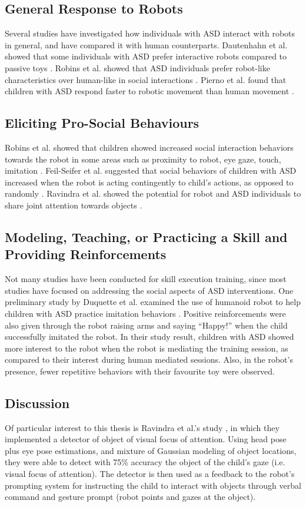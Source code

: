 \documentclass{ut-thesis}
\begin{document}
\subsection{General Response to Robots}
Several studies have investigated how individuals with ASD interact with robots in general, and have compared it with human counterparts.  Dautenhahn et al. showed that some individuals with ASD prefer interactive robots compared to passive toys \cite{dautenhahn2004towards}.  Robins et al. showed that ASD individuals prefer robot-like characteristics over human-like in social interactions \cite{robins2006does}.  Pierno et al. found that children with ASD respond faster to robotic movement than human movement \cite{pierno2008robotic}.


\subsection{Eliciting Pro-Social Behaviours}
Robins et al. showed that children showed increased social interaction behaviors towards the robot in some areas such as proximity to robot, eye gaze, touch, imitation \cite{robins2005robotic}.  Feil-Seifer et al. suggested that social behaviors of children with ASD increased when the robot is acting contingently to child's actions, as opposed to randomly \cite{feil2009toward}.  Ravindra et al. showed the potential for robot and ASD individuals to share joint attention towards objects \cite{ravindra2009therapeutic}.


\subsection{Modeling, Teaching, or Practicing a Skill and Providing Reinforcements}
Not many studies have been conducted for skill execution training, since most studies have focused on addressing the social aspects of ASD interventions.  One preliminary study by Duquette et al. examined the use of humanoid robot to help children with ASD practice imitation behaviors \cite{duquette2008exploring}.  Positive reinforcements were also given through the robot raising arms and saying ``Happy!'' when the child successfully imitated the robot.  In their study result, children with ASD showed more interest to the robot when the robot is mediating the training session, as compared to their interest during human mediated sessions.  Also, in the robot's presence, fewer repetitive behaviors with their favourite toy were observed.


\subsection{Discussion}
Of particular interest to this thesis is Ravindra et al.'s study \cite{ravindra2009therapeutic}, in which they implemented a detector of object of visual focus of attention.  Using head pose plus eye pose estimations, and mixture of Gaussian modeling of object locations, they were able to detect with 75\% accuracy the object of the child's gaze (i.e. visual focus of attention).  The detector is then used as a feedback to the robot's prompting system for instructing the child to interact with objects through verbal command and gesture prompt (robot points and gazes at the object).
\end{document}
